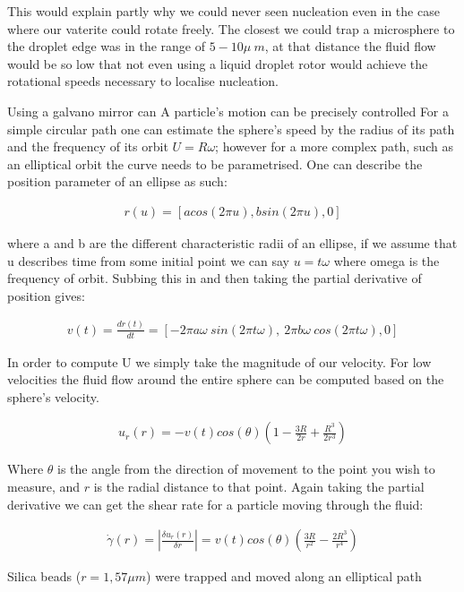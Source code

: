 This would explain partly why we could never seen nucleation even in the case where our vaterite could rotate freely. The closest we could trap a microsphere to the droplet edge was in the range of $5-10\mu\ m$, at that distance the fluid flow would be so low that not even using a liquid droplet rotor would achieve the rotational speeds necessary to localise nucleation.

Using a galvano mirror can A particle's motion can be precisely controlled For a simple circular path one can estimate the sphere's speed by the radius of its path and the frequency of its orbit $U = R\omega$; however for a more complex path, such as an elliptical orbit the curve needs to be parametrised. One can describe the position parameter of an ellipse as such:

\begin{align}
	r(u) = \left[acos(2\pi u),bsin(2\pi u), 0 \right]
\end{align}

where a and b are the different characteristic radii of an ellipse, if we assume that u describes time from some initial point we can say $u=t\omega$ where omega is the frequency of orbit. Subbing this in and then taking the partial derivative of position gives:

\begin{align}
	v(t) = \frac{dr(t)}{dt} = \left[-2\pi a\omega \ sin(2\pi t\omega),\ 2\pi b\omega \ cos(2\pi t\omega),0 \right]
\end{align}

In order to compute U we simply take the magnitude of our velocity. For low velocities the fluid flow around the entire sphere can be computed based on the sphere's velocity.

\begin{align}
	u_r(r)=-v(t)cos(\theta)\left(1-\frac{3R}{2r}+\frac{R^3}{2r^3}\right)
\end{align}

Where $\theta$ is the angle from the direction of movement to the point you wish to measure, and $r$ is the radial distance to that point. Again taking the partial derivative we can get the shear rate for a particle moving through the fluid:

\begin{align}
	\dot{\gamma}(r) = \left| \frac{\delta u_r(r)}{\delta r}\right| = v(t)cos(\theta)\left(\frac{3R}{r^2} -\frac{2R^3}{r^4} \right)
\end{align}

Silica beads ($r=1,57 \mu m$) were trapped and moved along an elliptical path
